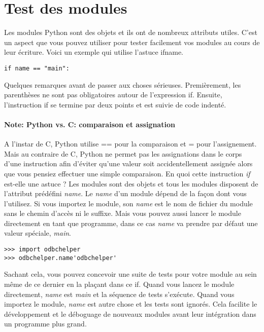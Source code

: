 \section{Test des modules}

Les modules Python sont des objets et ils ont de nombreux attributs utiles. C'est un aspect que vous pouvez utiliser pour tester facilement vos modules au cours de leur écriture. Voici un exemple qui utilise l'astuce ifname.

\begin{lstlisting}
if name == "main":
\end{lstlisting}

Quelques remarques avant de passer aux choses sérieuses. Premièrement, les parenthèses ne sont pas obligatoires autour de l'expression if. Ensuite, l'instruction if se termine par deux points et est suivie de code indenté.

\paragraph*{Note: Python vs. C: comparaison et assignation}
A l'instar de C, Python utilise == pour la comparaison et = pour l'assignement. Mais au contraire de C, Python ne permet pas les assignations dans le corps d'une instruction afin d'éviter qu'une valeur soit accidentellement assignée alors que vous pensiez effectuer une simple comparaison.
En quoi cette instruction \emph{if} est-elle une astuce ? Les modules sont des objets et tous les modules disposent de l'attribut prédéfini \emph{name}. Le \emph{name} d'un module dépend de la façon dont vous l'utilisez. Si vous importez le module, son \emph{name} est le nom de fichier du module sans le chemin d'accès ni le suffixe. Mais vous pouvez aussi lancer le module directement en tant que programme, dans ce cas \emph{name} va prendre par défaut une valeur spéciale, \emph{main}.

\begin{lstlisting}
>>> import odbchelper
>>> odbchelper.name'odbchelper'
\end{lstlisting}

Sachant cela, vous pouvez concevoir une suite de tests pour votre module au sein même de ce dernier en la plaçant dans ce if. Quand vous lancez le module directement, \emph{name} est \emph{main} et la séquence de tests s'exécute. Quand vous importez le module, \emph{name} est autre chose et les tests sont ignorés. Cela facilite le développement et le déboguage de nouveaux modules avant leur intégration dans un programme plus grand.

